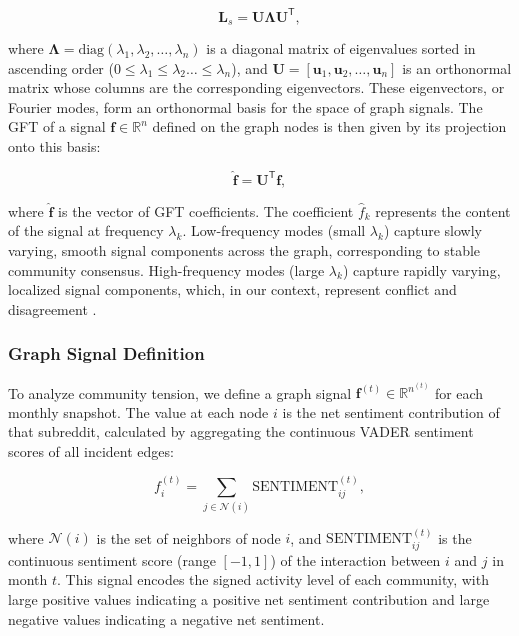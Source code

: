 \documentclass[a4paper,fleqn]{cas-dc}
\begin{document}
\begin{equation}
\label{eq:eigen_decomp}
\mathbf{L}_s = \mathbf{U} \boldsymbol{\Lambda} \mathbf{U}^{\mathsf{T}},
\end{equation}

where \( \boldsymbol{\Lambda} = \text{diag}(\lambda_1, \lambda_2, \dots, \lambda_n) \) is a diagonal matrix of eigenvalues sorted in ascending order (\( 0 \leq \lambda_1 \leq \lambda_2 \dots \leq \lambda_n \)), and \( \mathbf{U} = [\mathbf{u}_1, \mathbf{u}_2, \dots, \mathbf{u}_n] \) is an orthonormal matrix whose columns are the corresponding eigenvectors. These eigenvectors, or Fourier modes, form an orthonormal basis for the space of graph signals. The GFT of a signal \( \mathbf{f} \in \mathbb{R}^n \) defined on the graph nodes is then given by its projection onto this basis:

\begin{equation}
\label{eq:gft}
\hat{\mathbf{f}} = \mathbf{U}^{\mathsf{T}} \mathbf{f},
\end{equation}

where \( \hat{\mathbf{f}} \) is the vector of GFT coefficients. The coefficient \( \hat{f}_k \) represents the content of the signal at frequency \( \lambda_k \). Low-frequency modes (small \( \lambda_k \)) capture slowly varying, smooth signal components across the graph, corresponding to stable community consensus. High-frequency modes (large \( \lambda_k \)) capture rapidly varying, localized signal components, which, in our context, represent conflict and disagreement \cite{17_Shuman2013}.

\subsubsection{Graph Signal Definition}
\label{subsec:graph_signal}

To analyze community tension, we define a graph signal \( \mathbf{f}^{(t)} \in \mathbb{R}^{n^{(t)}} \) for each monthly snapshot. The value at each node \( i \) is the net sentiment contribution of that subreddit, calculated by aggregating the continuous VADER sentiment scores of all incident edges:

\begin{equation}
\label{eq:graph_signal}
f_i^{(t)} = \sum_{j \in \mathcal{N}(i)} \text{SENTIMENT}_{ij}^{(t)},
\end{equation}

where \( \mathcal{N}(i) \) is the set of neighbors of node \( i \), and \( \text{SENTIMENT}_{ij}^{(t)} \) is the continuous sentiment score (range $[-1,1]$) of the interaction between \( i \) and \( j \) in month \( t \). This signal encodes the signed activity level of each community, with large positive values indicating a positive net sentiment contribution and large negative values indicating a negative net sentiment.
\end{document}
